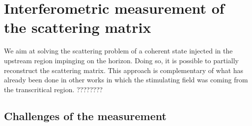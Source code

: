 \section{Interferometric measurement of the scattering matrix }
\label{sec:principle_measurement}

We aim at solving the scattering problem of a coherent state injected in the upstream region impinging on the horizon. Doing so, it is possible
to partially reconstruct the scattering matrix. This approach is complementary of what has already been done in other works in which 
the stimulating field was coming from the transcritical region. ???????? 

\subsection{Challenges of the measurement}


